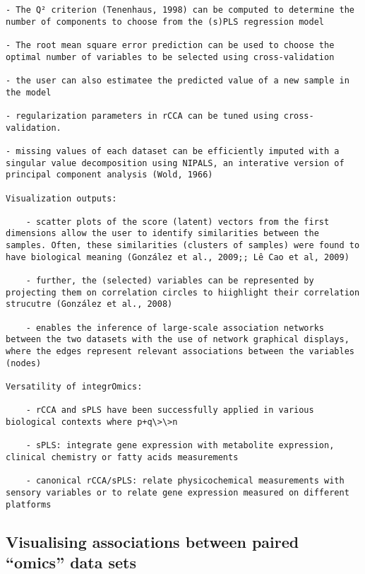 \documentclass[
]{book}
\begin{document}
\begin{verbatim}
- The Q² criterion (Tenenhaus, 1998) can be computed to determine the number of components to choose from the (s)PLS regression model

- The root mean square error prediction can be used to choose the optimal number of variables to be selected using cross-validation

- the user can also estimatee the predicted value of a new sample in the model

- regularization parameters in rCCA can be tuned using cross-validation.

- missing values of each dataset can be efficiently imputed with a singular value decomposition using NIPALS, an interative version of principal component analysis (Wold, 1966)

Visualization outputs:

    - scatter plots of the score (latent) vectors from the first dimensions allow the user to identify similarities between the samples. Often, these similarities (clusters of samples) were found to have biological meaning (González et al., 2009;; Lê Cao et al, 2009)

    - further, the (selected) variables can be represented by projecting them on correlation circles to hiighlight their correlation strucutre (González et al., 2008)

    - enables the inference of large-scale association networks between the two datasets with the use of network graphical displays, where the edges represent relevant associations between the variables (nodes)

Versatility of integrOmics:

    - rCCA and sPLS have been successfully applied in various biological contexts where p+q\>\>n

    - sPLS: integrate gene expression with metabolite expression, clinical chemistry or fatty acids measurements

    - canonical rCCA/sPLS: relate physicochemical measurements with sensory variables or to relate gene expression measured on different platforms
\end{verbatim}

\hypertarget{visualising-associations-between-paired-omics-data-sets}{%
\subsection{Visualising associations between paired ``omics'' data sets}\label{visualising-associations-between-paired-omics-data-sets}}
\end{document}

